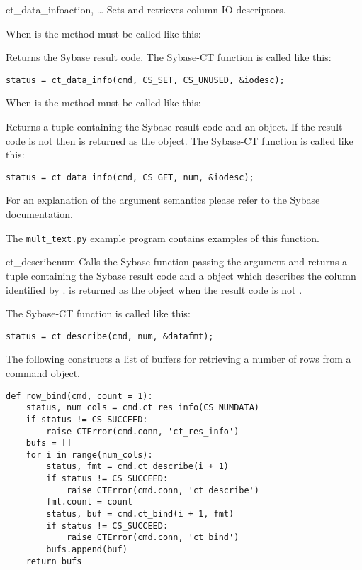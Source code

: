 \begin{methoddesc}[CS_COMMAND]{ct_data_info}{action, \ldots}
Sets and retrieves column IO descriptors.

When  is  the method must be called like
this:


Returns the Sybase result code.  The Sybase-CT
 function is called like this:

\begin{verbatim}
status = ct_data_info(cmd, CS_SET, CS_UNUSED, &iodesc);
\end{verbatim}

When  is  the method must be called like
this:


Returns a tuple containing the Sybase result code and an
 object.  If the result code is not 
then  is returned as the  object.  The
Sybase-CT  function is called like this:

\begin{verbatim}
status = ct_data_info(cmd, CS_GET, num, &iodesc);
\end{verbatim}

For an explanation of the argument semantics please refer to the
Sybase documentation.

The \texttt{mult_text.py} example program contains examples of this
function.
\end{methoddesc}

\begin{methoddesc}[CS_COMMAND]{ct_describe}{num}
Calls the Sybase  function passing the
 argument and returns a tuple containing the Sybase result
code and a  object which describes the column
identified by .  is returned as the
 object when the result code is not
.

The Sybase-CT  function is called like this:

\begin{verbatim}
status = ct_describe(cmd, num, &datafmt);
\end{verbatim}

The following constructs a list of buffers for retrieving a number of
rows from a command object.

\begin{verbatim}
def row_bind(cmd, count = 1):
    status, num_cols = cmd.ct_res_info(CS_NUMDATA)
    if status != CS_SUCCEED:
        raise CTError(cmd.conn, 'ct_res_info')
    bufs = []
    for i in range(num_cols):
        status, fmt = cmd.ct_describe(i + 1)
        if status != CS_SUCCEED:
            raise CTError(cmd.conn, 'ct_describe')
        fmt.count = count
        status, buf = cmd.ct_bind(i + 1, fmt)
        if status != CS_SUCCEED:
            raise CTError(cmd.conn, 'ct_bind')
        bufs.append(buf)
    return bufs
\end{verbatim}
\end{methoddesc}

